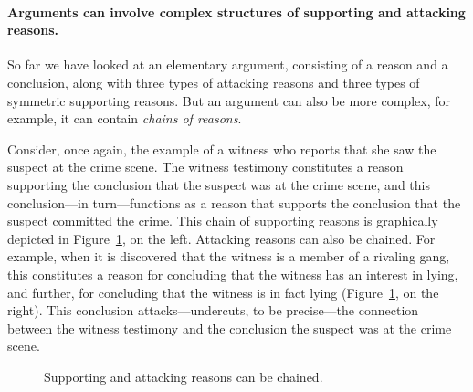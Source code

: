 \documentclass[10pt]{article}
\begin{document}
\paragraph{Arguments can involve complex structures of supporting and attacking reasons.} 

So far we have looked at an elementary argument, consisting of a reason and a conclusion, along with three types 
of attacking reasons and three types of symmetric supporting reasons. But an argument can also be more complex, 
for example, it can contain \textit{chains of reasons}. 

Consider, once again, the example of a witness who reports that she saw the suspect at the crime scene. The witness testimony constitutes a 
reason supporting the conclusion that the suspect was at the crime scene, and this conclusion---in turn---functions as a reason 
that supports the conclusion that the suspect committed the crime. This chain of supporting reasons 
is graphically depicted in Figure~\ref{fig:arg2}, on the left. 
Attacking reasons can also be chained. For example, when it is discovered that the witness is a member of a rivaling gang, 
this constitutes a reason for concluding that the witness has an interest in lying, and further, for concluding 
that the witness is in fact lying (Figure~\ref{fig:arg2}, on the right). This conclusion attacks---undercuts, to be precise---the connection 
between the witness testimony and the conclusion the suspect was at the crime scene.

\begin{figure}[bt]
\centering

\caption{Supporting and attacking reasons can be chained. \label{fig:arg2}}
\end{figure}
\end{document}
